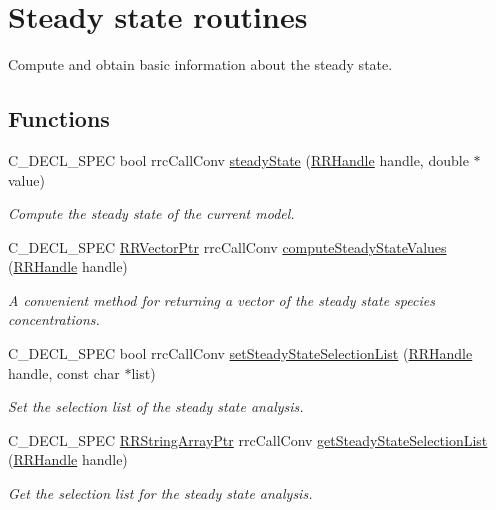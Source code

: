 \hypertarget{group__steadystate}{}\section{Steady state routines}
\label{group__steadystate}


Compute and obtain basic information about the steady state.  


\subsection*{Functions}
\begin{DoxyCompactItemize}
\item 
C\+\_\+\+D\+E\+C\+L\+\_\+\+S\+P\+E\+C bool rrc\+Call\+Conv \hyperlink{group__steadystate_gab1db24cab922136cc3a6a57b4bfbf80a}{steady\+State} (\hyperlink{rrc__types_8h_a1d68f0592372208fa5a5f2799ea4b3ae}{R\+R\+Handle} handle, double $\ast$value)
\begin{DoxyCompactList}\small\item\em Compute the steady state of the current model. \end{DoxyCompactList}\item 
C\+\_\+\+D\+E\+C\+L\+\_\+\+S\+P\+E\+C \hyperlink{rrc__types_8h_a3be72d6006034fd349f753d2bf441bf7}{R\+R\+Vector\+Ptr} rrc\+Call\+Conv \hyperlink{group__steadystate_ga808060f5094396e4697434eb5a41f14f}{compute\+Steady\+State\+Values} (\hyperlink{rrc__types_8h_a1d68f0592372208fa5a5f2799ea4b3ae}{R\+R\+Handle} handle)
\begin{DoxyCompactList}\small\item\em A convenient method for returning a vector of the steady state species concentrations. \end{DoxyCompactList}\item 
C\+\_\+\+D\+E\+C\+L\+\_\+\+S\+P\+E\+C bool rrc\+Call\+Conv \hyperlink{group__steadystate_gaff273d8a9038c411779b206bf58d71eb}{set\+Steady\+State\+Selection\+List} (\hyperlink{rrc__types_8h_a1d68f0592372208fa5a5f2799ea4b3ae}{R\+R\+Handle} handle, const char $\ast$list)
\begin{DoxyCompactList}\small\item\em Set the selection list of the steady state analysis. \end{DoxyCompactList}\item 
C\+\_\+\+D\+E\+C\+L\+\_\+\+S\+P\+E\+C \hyperlink{rrc__types_8h_a7c9475df6c7337d99482b13a365e7596}{R\+R\+String\+Array\+Ptr} rrc\+Call\+Conv \hyperlink{group__steadystate_gaadc456216e3ed8cd9f75c15ac1685616}{get\+Steady\+State\+Selection\+List} (\hyperlink{rrc__types_8h_a1d68f0592372208fa5a5f2799ea4b3ae}{R\+R\+Handle} handle)
\begin{DoxyCompactList}\small\item\em Get the selection list for the steady state analysis. \end{DoxyCompactList}\end{DoxyCompactItemize}



